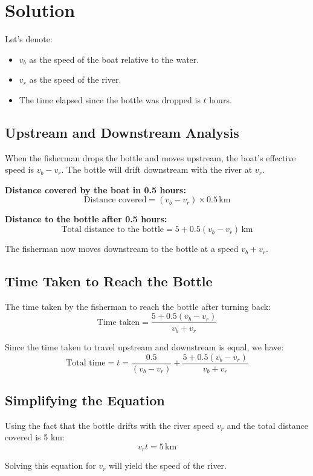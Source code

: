 \documentclass{article}
\begin{document}
\section*{Solution}

Let's denote:
\begin{itemize}
    \item \( v_b \) as the speed of the boat relative to the water.
    \item \( v_r \) as the speed of the river.
    \item The time elapsed since the bottle was dropped is \( t \) hours.
\end{itemize}

\subsection*{Upstream and Downstream Analysis}

When the fisherman drops the bottle and moves upstream, the boat's effective speed is \( v_b - v_r \). The bottle will drift downstream with the river at \( v_r \).

\textbf{Distance covered by the boat in 0.5 hours:}
\[
\text{Distance covered} = (v_b - v_r) \times 0.5 \, \text{km}
\]

\textbf{Distance to the bottle after 0.5 hours:}
\[
\text{Total distance to the bottle} = 5 + 0.5(v_b - v_r) \, \text{km}
\]

The fisherman now moves downstream to the bottle at a speed \( v_b + v_r \).

\subsection*{Time Taken to Reach the Bottle}

The time taken by the fisherman to reach the bottle after turning back:
\[
\text{Time taken} = \frac{5 + 0.5(v_b - v_r)}{v_b + v_r}
\]

Since the time taken to travel upstream and downstream is equal, we have:
\[
\text{Total time} = t = \frac{0.5}{(v_b - v_r)} + \frac{5 + 0.5(v_b - v_r)}{v_b + v_r}
\]

\subsection*{Simplifying the Equation}

Using the fact that the bottle drifts with the river speed \( v_r \) and the total distance covered is 5 km:
\[
v_r t = 5 \, \text{km}
\]

Solving this equation for \( v_r \) will yield the speed of the river.
\end{document}
